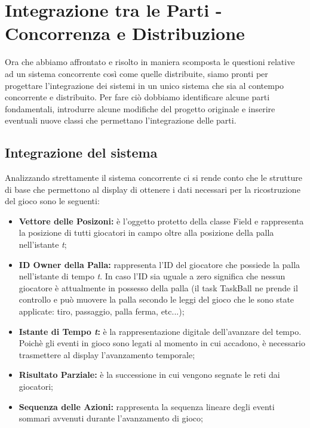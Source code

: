 \documentclass[aps,letterpaper,10pt]{article}
\begin{document}
\newpage

\section{Integrazione tra le Parti - Concorrenza e Distribuzione}

Ora che abbiamo affrontato e risolto in maniera scomposta le questioni relative ad un sistema concorrente cos\`i come quelle distribuite, siamo pronti per progettare l'integrazione dei sistemi in un unico sistema che sia al contempo concorrente e distribuito. Per fare ci\`o dobbiamo identificare alcune parti fondamentali, introdurre alcune modifiche del progetto originale e inserire eventuali nuove classi che permettano l'integrazione delle parti.

\subsection{Integrazione del sistema}

Analizzando strettamente il sistema concorrente ci si rende conto che le strutture di base che permettono al display di ottenere i dati necessari per la ricostruzione del gioco sono le seguenti:

\begin{itemize}
\item \textbf{Vettore delle Posizoni:}  \`e l'oggetto protetto della classe Field e rappresenta la posizione di tutti giocatori in campo oltre alla posizione della palla nell'istante \emph{t};
\item \textbf{ID Owner della Palla:} rappresenta l'ID del giocatore che possiede la palla nell'istante di tempo \emph{t}. In caso l'ID sia uguale a zero significa che nessun giocatore \`e attualmente in possesso della palla (il task TaskBall ne prende il controllo e pu\`o muovere la palla secondo le leggi del gioco che le sono state applicate: tiro, passaggio, palla ferma, etc...);
\item \textbf{Istante di Tempo \emph{t}:} \`e la rappresentazione digitale dell'avanzare del tempo. Poich\`e gli eventi in gioco sono legati al momento in cui accadono, \`e necessario trasmettere al display l'avanzamento temporale;
\item \textbf{Risultato Parziale:} \`e la successione in cui vengono segnate le reti dai giocatori;
\item \textbf{Sequenza delle Azioni:} rappresenta la sequenza lineare degli eventi sommari avvenuti durante l'avanzamento di gioco;
\end{itemize}
\end{document}
